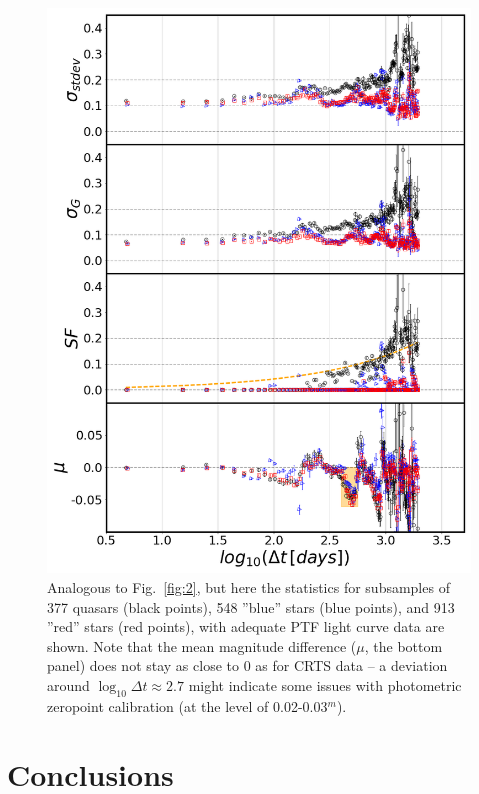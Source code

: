 \documentclass[fleqn,usenatbib]{mnras}
\begin{document}
\begin{figure}
\includegraphics[width=1.1\columnwidth, center]{Fig_6.png}
\caption{Analogous to Fig.~\ref{fig:2}, but here the statistics for subsamples of 377 quasars (black points), 548 ''blue'' stars (blue points), and 913 ''red'' stars (red points), with adequate PTF light curve data are shown. Note that the mean magnitude difference ($\mu$, the bottom panel) does not stay as close to 0 as for CRTS data -- a deviation around $\log_{10} \Delta t \approx 2.7$ might indicate some issues with photometric zeropoint calibration (at the level of 0.02-0.03$^m$).}
\label{fig:2PTF} 
\end{figure}



\section{Conclusions}
\end{document}
